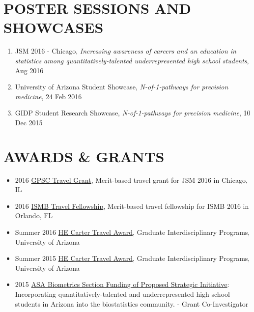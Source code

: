 \documentclass[paper=a4,fontsize=11pt]{scrartcl} %
\newcommand{\NewPart}[2]{\section*{\uppercase{#1} #2 }}
\newcommand{\TalkEntry}[4]{
		\noindent #1, #2, #3 #4}
\begin{document}
\NewPart{Poster sessions and Showcases}{}
\vspace{-7pt}
\begin{enumerate}
\item\TalkEntry{JSM 2016 - Chicago}{\textit{Increasing awareness of careers and an education in statistics among quantitatively-talented underrepresented high school students}}{Aug 2016}{}
\item\TalkEntry{University of Arizona Student Showcase}{\textit{N-of-1-pathways for precision medicine}}{24 Feb 2016}{}
\item\TalkEntry{GIDP Student Research Showcase}{\textit{N-of-1-pathways for precision medicine}}{10 Dec 2015}{}
\vspace{-7pt}
\end{enumerate}


\NewPart{Awards \& Grants}{}
\vspace{-7pt}
\begin{itemize}[noitemsep]
\item 2016 \href{http://gpsc.arizona.edu/travel-grants}{GPSC Travel Grant}, Merit-based travel grant for JSM 2016 in Chicago, IL
\item 2016 \href{https://www.iscb.org/ismb2016-submission/ismb2016-travel-fellowship-2}{ISMB Travel Fellowship}, Merit-based travel fellowship for ISMB 2016 in Orlando, FL
\item Summer 2016 \href{https://gidp.arizona.edu/carter-travel-award/award-recipients}{HE Carter Travel Award}, Graduate Interdisciplinary Programs, University of Arizona 
\item Summer 2015 \href{https://gidp.arizona.edu/carter-travel-award/award-recipients}{HE Carter Travel Award}, Graduate Interdisciplinary Programs, University of Arizona 
\item 2015 \href{http://stattrak.amstat.org/2014/03/01/grant-opportunity}{ASA Biometrics Section Funding of Proposed Strategic Initiative}:  Incorporating quantitatively-talented and underrepresented high school students in Arizona into the biostatistics community. - Grant Co-Investigator
\vspace{-7pt}
\end{itemize}
\end{document}
